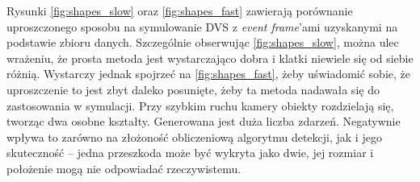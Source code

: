 Rysunki \ref{fig:shapes_slow} oraz \ref{fig:shapes_fast} zawierają porównanie uproszczonego sposobu na symulowanie DVS z \textit{event frame}'ami uzyskanymi na podstawie zbioru danych. Szczególnie obserwując \ref{fig:shapes_slow}, można ulec wrażeniu, że prosta metoda jest wystarczająco dobra i klatki niewiele się od siebie różnią. Wystarczy jednak spojrzeć na \ref{fig:shapes_fast}, żeby uświadomić sobie, że uproszczenie to jest zbyt daleko posunięte, żeby ta metoda nadawała się do zastosowania w symulacji. Przy szybkim ruchu kamery obiekty rozdzielają się, tworząc dwa osobne kształty. Generowana jest duża liczba zdarzeń. Negatywnie wpływa to zarówno na złożoność obliczeniową algorytmu detekcji, jak i jego skuteczność -- jedna przeszkoda może być wykryta jako dwie, jej rozmiar i położenie mogą nie odpowiadać rzeczywistemu.

